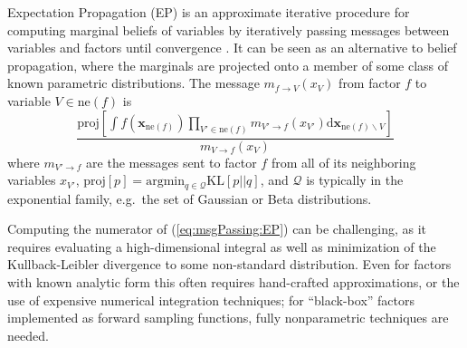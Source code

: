 \documentclass[english]{article}
\theoremstyle{plain}
\theoremstyle{plain}
\newcommand{\bx}{\mathbf{x}}				%
\newcommand{\factor}{f}				%
\newcommand{\outV}{V}                         %
\newcommand{\fis}[1]{\mathrm{ne}(#1)}   	%
\newcommand{\fx}[1]{ \mathbf{x}_{\mathrm{ne}(#1)} }   	%
\newcommand{\xin}{\mathbf{x}_{ \mathrm{in} }} 			%
\newcommand{\xout}{\mathbf{x}_{ \mathrm{out} }}			%
\newcommand{\msg}[2]{m_{#1 \rightarrow #2}}			%
\newcommand{\diffd}{\mathrm{d}}
\newcommand{\projP}[1]{\mathrm{proj} \left [ #1 \right]}
\newcommand{\argmin}[1]{\mathrm{arg}\mathrm{min}_{#1}}
\newcommand{\kld}[2]{\mathrm{KL} \left [ #1 || #2 \right ]}
\begin{document}
Expectation Propagation (EP) is an approximate iterative procedure for computing marginal beliefs of variables
by iteratively passing messages between variables and factors until convergence \citep{Minka2001}.
It can be seen as an alternative to belief propagation, where the marginals are projected
onto a member of some class of known parametric distributions. 
The message $\msg{ \factor }{\outV}(x_{\outV})$  from factor $\factor$ to variable $\outV\in\fis{\factor}$ is 
%
\begin{equation}
\frac{ \projP{ 
\int \factor (\fx{\factor}) \prod_{\outV' \in \fis{\factor}} \msg{\outV'}{\factor}(x_{\outV'}) \diffd 
\bx_{\fis{\factor} \backslash \outV}} }
{\msg{\outV}{\factor}(x_{\outV})}
%
\label{eq:msgPassing:EP}
\end{equation}
%
where $\msg{\outV'}{\factor}$ are the messages sent to factor $\factor$ from all of its neighboring variables $x_{\outV'}$,
$\projP{p} = \argmin{q \in \mathcal{Q}} \kld{p}{q}$, and $\mathcal{Q}$ is typically in the exponential family, e.g.\ the set of Gaussian or Beta distributions.



Computing the numerator of (\ref{eq:msgPassing:EP}) can be challenging, as it requires evaluating a high-dimensional integral as well as minimization of the Kullback-Leibler divergence to some non-standard distribution. Even for factors with known analytic form this often requires hand-crafted approximations, or the use of expensive numerical integration techniques; for ``black-box'' factors implemented as forward sampling functions, fully nonparametric techniques are needed. 

\end{document}
